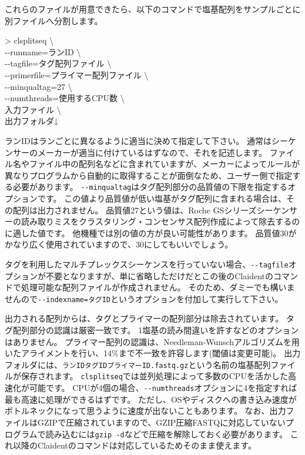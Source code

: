 \documentclass[titlepage,10pt,a4paper]{jsbook}
\newenvironment{cmd}{\begin{oframed}\raggedright\ttfamily\footnotesize\setlength{\baselineskip}{1.4em}}{\end{oframed}\vspace{-1em}}
\begin{document}
これらのファイルが用意できたら、以下のコマンドで塩基配列をサンプルごとに別ファイルへ分割します。
\begin{cmd}
{\textgreater} clsplitseq {\textbackslash}\\
{-}{-}runname=ランID {\textbackslash}\\
{-}{-}tagfile=タグ配列ファイル {\textbackslash}\\
{-}{-}primerfile=プライマー配列ファイル {\textbackslash}\\
{-}{-}minqualtag=27 {\textbackslash}\\
{-}{-}numthreads=使用するCPU数 {\textbackslash}\\
入力ファイル {\textbackslash}\\
出力フォルダ↓
\end{cmd}
ランIDはランごとに異なるように適当に決めて指定して下さい。
通常はシーケンサーのメーカーが適当に付けているはずなので、それを記述します。
ファイル名やファイル中の配列名などに含まれていますが、メーカーによってルールが異なりプログラムから自動的に取得することが面倒なため、ユーザー側で指定する必要があります。
\texttt{{-}{-}minqualtag}はタグ配列部分の品質値の下限を指定するオプションです。
この値より品質値が低い塩基がタグ配列に含まれる場合は、その配列は出力されません。
品質値27という値は、Roche GSシリーズシーケンサーの読み取りミスをクラスタリング・コンセンサス配列作成によって除去するのに適した値です\citep{Kunin2010}。
他機種では別の値の方が良い可能性があります。
品質値30がかなり広く使用されていますので、30にしてもいいでしょう。

タグを利用したマルチプレックスシーケンスを行っていない場合、\texttt{{-}{-}tagfile}オプションが不要となりますが、単に省略しただけだとこの後のClaidentのコマンドで処理可能な配列ファイルが作成されません。
そのため、ダミーでも構いませんので\texttt{{-}{-}indexname=タグID}というオプションを付加して実行して下さい。

出力される配列からは、タグとプライマーの配列部分は除去されています。
タグ配列部分の認識は厳密一致です。
1塩基の読み間違いを許すなどのオプションはありません。
プライマー配列の認識は、Needleman-Wunschアルゴリズムを用いたアライメントを行い、14\%まで不一致を許容します(閾値は変更可能)。
出力フォルダには、\texttt{ランID{\textunderscore}{\textunderscore}タグID{\textunderscore}{\textunderscore}プライマーID.fastq.gz}という名前の塩基配列ファイルが保存されます。
\texttt{clsplitseq}では並列処理によって多数のCPUを活かした高速化が可能です。
CPUが4個の場合、\texttt{{-}{-}numthreads}オプションに4を指定すれば最も高速に処理ができるはずです。
ただし、OSやディスクへの書き込み速度がボトルネックになって思うように速度が出ないこともあります。
なお、出力ファイルはGZIPで圧縮されていますので、GZIP圧縮FASTQに対応していないプログラムで読み込むには\texttt{gzip -d}などで圧縮を解除しておく必要があります。
これ以降のClaidentのコマンドは対応しているためそのまま使えます。
\end{document}
